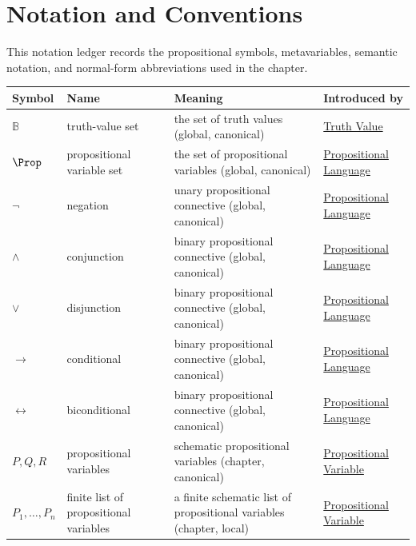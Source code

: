 \section{Notation and Conventions}

\begin{tcolorbox}[
  colback=gray!6,
  colframe=gray!40,
  arc=2pt,
  left=8pt, right=8pt, top=6pt, bottom=6pt,
  title={\small\textbf{Toolkit}},
  fonttitle=\small\bfseries
]
This notation ledger records the propositional symbols, metavariables,
semantic notation, and normal-form abbreviations used in the chapter.
\end{tcolorbox}

\begin{longtable}{p{}p{}p{}p{}}
\textbf{Symbol} & \textbf{Name} & \textbf{Meaning} & \textbf{Introduced by}\\
\hline
\(\mathbb{B}\) & truth-value set & the set of truth values (global, canonical) & \hyperref[def:truth-value-propositional-logic]{Truth Value}\\
\(\Prop\) & propositional variable set & the set of propositional variables (global, canonical) & \hyperref[def:propositional-language]{Propositional Language}\\
\(\neg\) & negation & unary propositional connective (global, canonical) & \hyperref[def:propositional-language]{Propositional Language}\\
\(\land\) & conjunction & binary propositional connective (global, canonical) & \hyperref[def:propositional-language]{Propositional Language}\\
\(\lor\) & disjunction & binary propositional connective (global, canonical) & \hyperref[def:propositional-language]{Propositional Language}\\
\(\to\) & conditional & binary propositional connective (global, canonical) & \hyperref[def:propositional-language]{Propositional Language}\\
\(\leftrightarrow\) & biconditional & binary propositional connective (global, canonical) & \hyperref[def:propositional-language]{Propositional Language}\\
\(P,Q,R\) & propositional variables & schematic propositional variables (chapter, canonical) & \hyperref[def:propositional-variable]{Propositional Variable}\\
\(P_1,\ldots,P_n\) & finite list of propositional variables & a finite schematic list of propositional variables (chapter, local) & \hyperref[def:propositional-variable]{Propositional Variable}\\

\end{longtable}
